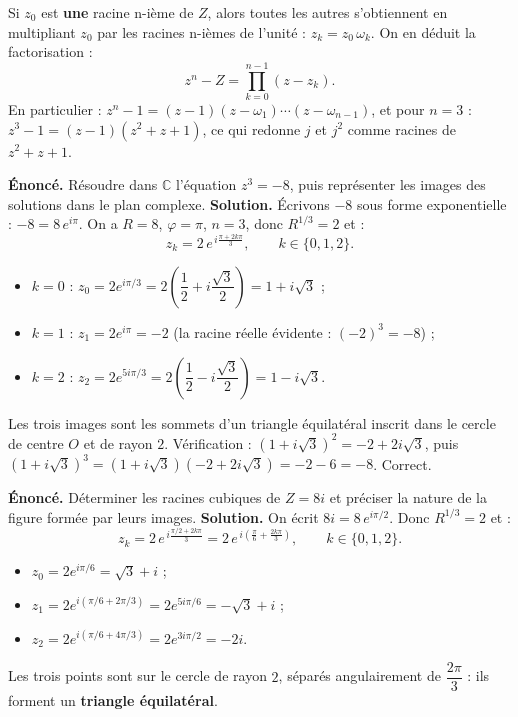 \documentclass[11pt]{article}
\begin{document}
\begin{aretenir}
Si $z_0$ est \textbf{une} racine n-ième de $Z$, alors toutes les autres s'obtiennent en multipliant $z_0$ par les racines n-ièmes de l'unité : $z_k = z_0 \, \omega_k$. On en déduit la factorisation :
\[
z^n - Z = \prod_{k=0}^{n-1} (z - z_k).
\]
En particulier : $z^n - 1 = (z-1)(z - \omega_1)\cdots(z-\omega_{n-1})$, et pour $n = 3$ : $z^3 - 1 = (z-1)(z^2 + z + 1)$, ce qui redonne $j$ et $j^2$ comme racines de $z^2+z+1$.
\end{aretenir}

\begin{exoresolu}[Résoudre $z^3 = -8$ et représenter les solutions]
\textbf{Énoncé.} Résoudre dans $\mathbb{C}$ l'équation $z^3 = -8$, puis représenter les images des solutions dans le plan complexe.
\tcblower
\textbf{Solution.} Écrivons $-8$ sous forme exponentielle : $-8 = 8\,e^{i\pi}$. On a $R = 8$, $\varphi = \pi$, $n = 3$, donc $R^{1/3} = 2$ et :
\[
z_k = 2\, e^{\,i\frac{\pi + 2k\pi}{3}}, \qquad k \in \{0, 1, 2\}.
\]
\begin{itemize}
\item $k = 0$ : $z_0 = 2e^{i\pi/3} = 2\left(\dfrac{1}{2} + i\dfrac{\sqrt{3}}{2}\right) = 1 + i\sqrt{3}$ ;
\item $k = 1$ : $z_1 = 2e^{i\pi} = -2$ (la racine réelle évidente : $(-2)^3 = -8$) ;
\item $k = 2$ : $z_2 = 2e^{5i\pi/3} = 2\left(\dfrac{1}{2} - i\dfrac{\sqrt{3}}{2}\right) = 1 - i\sqrt{3}$.
\end{itemize}
Les trois images sont les sommets d'un triangle équilatéral inscrit dans le cercle de centre $O$ et de rayon $2$. Vérification : $(1+i\sqrt{3})^2 = -2 + 2i\sqrt{3}$, puis $(1+i\sqrt{3})^3 = (1+i\sqrt{3})(-2+2i\sqrt{3}) = -2 - 6 = -8$. Correct.
\end{exoresolu}

\begin{exoresolu}
\textbf{Énoncé.} Déterminer les racines cubiques de $Z = 8i$ et préciser la nature de la figure formée par leurs images.
\tcblower
\textbf{Solution.} On écrit $8i = 8\,e^{i\pi/2}$. Donc $R^{1/3} = 2$ et :
\[
z_k = 2\, e^{\,i\frac{\pi/2 + 2k\pi}{3}} = 2\, e^{\,i\left(\frac{\pi}{6} + \frac{2k\pi}{3}\right)}, \qquad k \in \{0,1,2\}.
\]
\begin{itemize}
\item $z_0 = 2e^{i\pi/6} = \sqrt{3} + i$ ;
\item $z_1 = 2e^{i(\pi/6 + 2\pi/3)} = 2e^{5i\pi/6} = -\sqrt{3} + i$ ;
\item $z_2 = 2e^{i(\pi/6 + 4\pi/3)} = 2e^{3i\pi/2} = -2i$.
\end{itemize}
Les trois points sont sur le cercle de rayon $2$, séparés angulairement de $\dfrac{2\pi}{3}$ : ils forment un \textbf{triangle équilatéral}.
\end{exoresolu}
\end{document}
